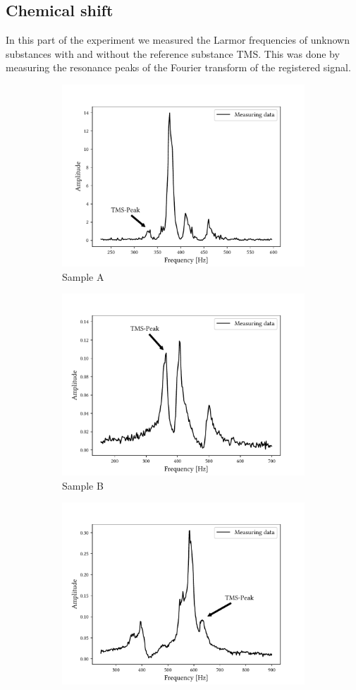 \subsection{Chemical shift}
In this part of the experiment we measured the Larmor frequencies of unknown substances with and without the reference substance TMS.
This was done by measuring the resonance peaks of the Fourier transform of the registered signal.
\begin{figure}[ht]
\begin{subfigure}{.45\textwidth}
\includegraphics[width=9.3cm]{..//figures//f61_abb_4.pdf}
\caption{Sample A}
\end{subfigure}
\qquad
\begin{subfigure}{.495\textwidth}
\includegraphics[width=9.3cm]{..//figures//f61_abb_5.pdf}
\caption{Sample B}
\end{subfigure}
\qquad
\begin{subfigure}{.45\textwidth}
\includegraphics[width=9.3cm]{..//figures//f61_abb_6.pdf}

\end{subfigure}
\end{figure}
